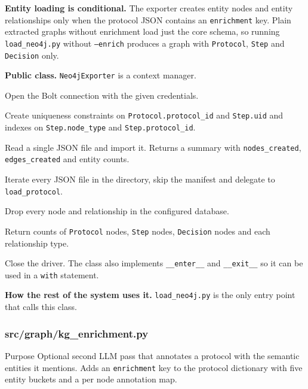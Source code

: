 \documentclass{article}
\begin{document}
\textbf{Entity loading is conditional.} The exporter creates entity
nodes and entity relationships only when the protocol JSON contains
an \texttt{enrichment} key. Plain extracted graphs without
enrichment load just the core schema, so running
\texttt{load\_neo4j.py} without \texttt{--enrich} produces a graph
with \texttt{Protocol}, \texttt{Step} and \texttt{Decision} only.

\textbf{Public class.} \texttt{Neo4jExporter} is a context manager.

\begin{description}[leftmargin=2em, style=nextline]
\item[\texttt{\_\_init\_\_(uri, user, password, database="neo4j")}]
Open the Bolt connection with the given credentials.
\item[\texttt{create\_constraints()}]
Create uniqueness constraints on \texttt{Protocol.protocol\_id} and
\texttt{Step.uid} and indexes on \texttt{Step.node\_type} and
\texttt{Step.protocol\_id}.
\item[\texttt{load\_protocol(json\_path)}]
Read a single JSON file and import it. Returns a summary with
\texttt{nodes\_created}, \texttt{edges\_created} and entity counts.
\item[\texttt{load\_all(directory, pattern="*.json")}]
Iterate every JSON file in the directory, skip the manifest and
delegate to \texttt{load\_protocol}.
\item[\texttt{clear\_database()}]
Drop every node and relationship in the configured database.
\item[\texttt{get\_graph\_stats()}]
Return counts of \texttt{Protocol} nodes, \texttt{Step} nodes,
\texttt{Decision} nodes and each relationship type.
\item[\texttt{close()}]
Close the driver. The class also implements \texttt{\_\_enter\_\_}
and \texttt{\_\_exit\_\_} so it can be used in a \texttt{with}
statement.
\end{description}

\textbf{How the rest of the system uses it.}
\texttt{load\_neo4j.py} is the only entry point that calls this
class.

\subsubsection{src/graph/kg\_enrichment.py}

\begin{codeconceptbox}{Purpose}
Optional second LLM pass that annotates a protocol with the semantic
entities it mentions. Adds an \texttt{enrichment} key to the protocol
dictionary with five entity buckets and a per node annotation map.
\end{codeconceptbox}
\end{document}
